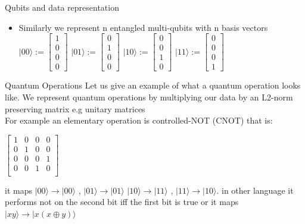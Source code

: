     \begin{frame}{Qubits and data representation}
        \begin{itemize}
            \item Similarly we represent n \alert{entangled} multi-qubits with n basis vectors\\
            $|00\rangle := \begin{bmatrix}
                1\\
                0\\
                0\\
                0
            \end{bmatrix}$
            $|01\rangle := \begin{bmatrix}
                0\\
                1\\
                0\\
                0
            \end{bmatrix}$
            $|10\rangle := \begin{bmatrix}
                0\\
                0\\
                1\\
                0
            \end{bmatrix}$
            $|11\rangle := \begin{bmatrix}
                0\\
                0\\
                0\\
                1
            \end{bmatrix}$
        \end{itemize}
    \end{frame}

    \begin{frame}{Quantum Operations}
        Let us give an example of what a quantum operation looks like.
        We represent quantum operations by multiplying our data by an L2-norm preserving matrix e.g unitary matrices\\
        For example an elementary operation is controlled-NOT (CNOT) that is:\\
        \begin{center}
        $\begin{bmatrix}
            1&0&0&0\\
            0&1&0&0\\
            0&0&0&1\\
            0&0&1&0\\
        \end{bmatrix}$\\
    \end{center}
    it maps $|00\rangle \rightarrow |00\rangle$ , $|01\rangle \rightarrow |01\rangle$
    $|10\rangle \rightarrow |11\rangle$ {,} $|11\rangle \rightarrow |10\rangle$. in other language
    it performs not on the second bit iff the first bit is true or it maps $|xy\rangle \rightarrow |x(x\oplus y)\rangle$

    \end{frame}
    
